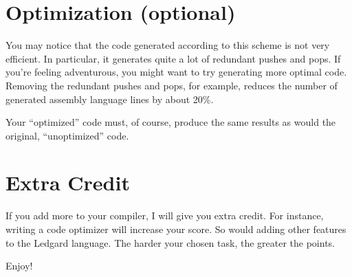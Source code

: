 \documentclass{article}
\begin{document}
\section{Optimization (optional)}
You may notice that the code generated according to this scheme is not
very efficient. In particular, it generates quite a lot of redundant
pushes and pops. If you're feeling adventurous, you might want to try
generating more optimal code. Removing the redundant pushes and pops,
for example, reduces the number of generated assembly language lines
by about 20\%.  

Your ``optimized'' code must, of course, produce the same
results as would the original, ``unoptimized'' code.


\section{Extra Credit}
If you add more to your compiler, I will give you extra credit.  For
instance, writing a code optimizer will increase your score.  So would
adding other features to the Ledgard language.  The harder your chosen
task, the greater the points.

Enjoy!
\end{document}
